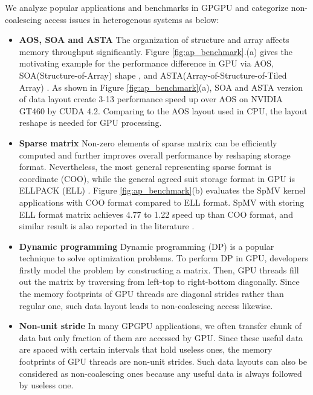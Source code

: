 \documentclass[10pt,journal,compsoc]{IEEEtran}
\begin{document}
We analyze popular applications and benchmarks \cite{rodinia:} in GPGPU and categorize
non-coalescing access issues in heterogenous systems as below:

\begin{itemize}
  \item \textbf{AOS, SOA and ASTA} The organization of structure and array affects memory throughput significantly. Figure \ref{fig:ap_benchmark}.(a) gives the motivating example for the performance
difference in GPU via AOS, SOA(Structure-of-Array) shape \cite{MemoryAccessPattern}, and
ASTA(Array-of-Structure-of-Tiled Array) \cite{ASTA}.
As shown in Figure \ref{fig:ap_benchmark}(a), SOA and ASTA version of data layout create 3-13 performance speed up over AOS on NVIDIA GT460 by CUDA 4.2.
Comparing to the AOS layout used in CPU, the layout reshape is needed for GPU processing.
  \item \textbf{Sparse matrix} Non-zero elements of sparse matrix can be efficiently computed and further improves overall performance by
reshaping storage format. Nevertheless, the most general representing sparse format is coordinate (COO), while
the general agreed suit storage format in GPU is ELLPACK (ELL) \cite{AdELL}\cite{AutoSpMV}.
Figure \ref{fig:ap_benchmark}(b) evaluates the SpMV kernel applications with COO format compared to ELL format.
SpMV with storing ELL format matrix achieves 4.77 to 1.22 speed up than COO format, and similar result is also reported in the literature \cite{spmv_CUDA}.
  \item \textbf{Dynamic programming} Dynamic programming (DP) is a popular technique to solve optimization problems. To perform DP in GPU,
developers firstly model the problem by constructing a matrix. Then, GPU threads fill out the matrix
by traversing from left-top to right-bottom diagonally. Since the memory footprints of GPU threads are
diagonal strides rather than regular one, such data layout leads to non-coalescing access likewise.
  \item \textbf{Non-unit stride} In many GPGPU applications, we often transfer chunk of data but only fraction of them are accessed by GPU. Since these useful data are spaced with certain intervals that hold useless ones, the memory footprints of GPU threads are non-unit strides. Such data layouts can also be considered as non-coalescing ones because any useful data is always followed by useless one.
\end{itemize}



\end{document}
